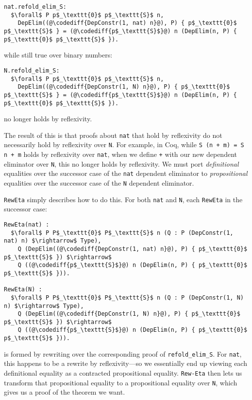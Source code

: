 \begin{lstlisting}
nat.refold_elim_S:
  $\forall$ P p$_\texttt{0}$ p$_\texttt{S}$ n,
    DepElim((@\codediff{DepConstr(1, nat) n}@), P) { p$_\texttt{0}$ p$_\texttt{S}$ } = (@\codediff{p$_\texttt{S}$}@) n (DepElim(n, P) { p$_\texttt{0}$ p$_\texttt{S}$ }).
\end{lstlisting}
while still true over binary numbers:

\begin{lstlisting}
N.refold_elim_S:
  $\forall$ P p$_\texttt{0}$ p$_\texttt{S}$ n,
    DepElim((@\codediff{DepConstr(1, N) n}@), P) { p$_\texttt{0}$ p$_\texttt{S}$ } = (@\codediff{p$_\texttt{S}$}@) n (DepElim(n, P) { p$_\texttt{0}$ p$_\texttt{S}$ }).
\end{lstlisting}
no longer holds by reflexivity.

The result of this is that proofs about \lstinline{nat} that hold by reflexivity
do not necessarily hold by reflexivity over \lstinline{N}. For example, in Coq,
while \lstinline{S (n + m) = S n + m} holds by reflexivity over \lstinline{nat},
when we define \lstinline{+} with our new dependent eliminator over \lstinline{N},
this no longer holds by reflexivity.
We must port \textit{definitional} equalities over the successor case of the \lstinline{nat} dependent eliminator
to \textit{propositional} equalities over the successor case of the \lstinline{N} dependent eliminator.

\lstinline{RewEta} simply describes how to do this.
For both \lstinline{nat} and \lstinline{N}, each \lstinline{RewEta} in the successor case:

\begin{lstlisting}
RewEta(nat) :
  $\forall$ P P$_\texttt{0}$ P$_\texttt{S}$ n (Q : P (DepConstr(1, nat) n) $\rightarrow$ Type),
    Q (DepElim((@\codediff{DepConstr(1, nat) n}@), P) { p$_\texttt{0}$ p$_\texttt{S}$ }) $\rightarrow$ 
    Q ((@\codediff{p$_\texttt{S}$}@) n (DepElim(n, P) { p$_\texttt{0}$ p$_\texttt{S}$ })).

RewEta(N) :
  $\forall$ P P$_\texttt{0}$ P$_\texttt{S}$ n (Q : P (DepConstr(1, N) n) $\rightarrow$ Type),
    Q (DepElim((@\codediff{DepConstr(1, N) n}@), P) { p$_\texttt{0}$ p$_\texttt{S}$ }) $\rightarrow$ 
    Q ((@\codediff{p$_\texttt{S}$}@) n (DepElim(n, P) { p$_\texttt{0}$ p$_\texttt{S}$ })).
\end{lstlisting}
is formed by rewriting over the corresponding proof of \lstinline{refold_elim_S}.
For \lstinline{nat}, this happens to be a rewrite by reflexivity---so we essentially end up
viewing each definitional equality as a contracted propositional equality.
\lstinline{Rew-Eta} then lets us transform that propositional equality to a propositional equality over \lstinline{N},
which gives us a proof of the theorem we want.

